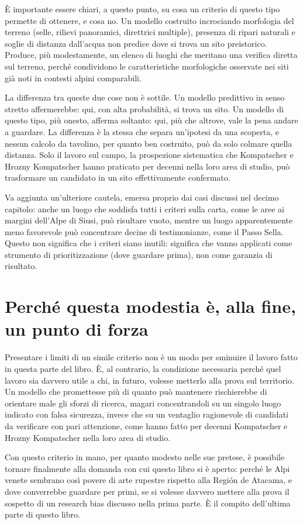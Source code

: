 È importante essere chiari, a questo punto, su cosa un criterio di questo tipo permette di ottenere, e cosa no. Un modello costruito incrociando morfologia del terreno (selle, rilievi panoramici, direttrici multiple), presenza di ripari naturali e soglie di distanza dall'acqua non predice dove si trova un sito preistorico. Produce, più modestamente, un elenco di luoghi che meritano una verifica diretta sul terreno, perché condividono le caratteristiche morfologiche osservate nei siti già noti in contesti alpini comparabili.

La differenza tra queste due cose non è sottile. Un modello predittivo in senso stretto affermerebbe: qui, con alta probabilità, si trova un sito. Un modello di questo tipo, più onesto, afferma soltanto: qui, più che altrove, vale la pena andare a guardare. La differenza è la stessa che separa un'ipotesi da una scoperta, e nessun calcolo da tavolino, per quanto ben costruito, può da solo colmare quella distanza. Solo il lavoro sul campo, la prospezione sistematica che Kompatscher e Hrozny Kompatscher hanno praticato per decenni nella loro area di studio, può trasformare un candidato in un sito effettivamente confermato.

Va aggiunta un'ulteriore cautela, emersa proprio dai casi discussi nel decimo capitolo: anche un luogo che soddisfa tutti i criteri sulla carta, come le aree ai margini dell'Alpe di Siusi, può risultare vuoto, mentre un luogo apparentemente meno favorevole può concentrare decine di testimonianze, come il Passo Sella. Questo non significa che i criteri siano inutili: significa che vanno applicati come strumento di prioritizzazione (dove guardare prima), non come garanzia di risultato.

\section{Perché questa modestia è, alla fine, un punto di forza}

Presentare i limiti di un simile criterio non è un modo per sminuire il lavoro fatto in questa parte del libro. È, al contrario, la condizione necessaria perché quel lavoro sia davvero utile a chi, in futuro, volesse metterlo alla prova sul territorio. Un modello che promettesse più di quanto può mantenere rischierebbe di orientare male gli sforzi di ricerca, magari concentrandoli su un singolo luogo indicato con falsa sicurezza, invece che su un ventaglio ragionevole di candidati da verificare con pari attenzione, come hanno fatto per decenni Kompatscher e Hrozny Kompatscher nella loro area di studio.

Con questo criterio in mano, per quanto modesto nelle sue pretese, è possibile tornare finalmente alla domanda con cui questo libro si è aperto: perché le Alpi venete sembrano così povere di arte rupestre rispetto alla Región de Atacama, e dove converrebbe guardare per primi, se si volesse davvero mettere alla prova il sospetto di un research bias discusso nella prima parte. È il compito dell'ultima parte di questo libro.
